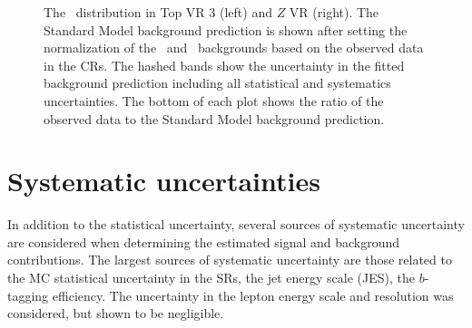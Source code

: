 \begin{figure}
  \centering
  \caption{The \HT\ distribution in Top VR 3 (left) and $Z$ VR (right).
    The Standard Model background prediction is shown after setting the
    normalization of the \TTBAR\ and \ZGAMMAJETS\ backgrounds based on the
    observed data in the CRs.
    The hashed bands show the uncertainty in the fitted background prediction
    including all statistical and systematics uncertainties.
    The bottom of each plot shows the ratio of the observed data to the
    Standard Model background prediction.
  }
  \label{fig:ht_vr}
\end{figure}


\FloatBarrier
\section{Systematic uncertainties}
\label{sec:systematics}

In addition to the statistical uncertainty, several sources of systematic
uncertainty are considered when determining the estimated signal and background
contributions.
The largest sources of systematic uncertainty are those related to the
MC statistical uncertainty in the SRs, the jet energy scale (JES),
the $b$-tagging efficiency.
The uncertainty in the lepton energy scale and resolution was considered,
but shown to be negligible.


